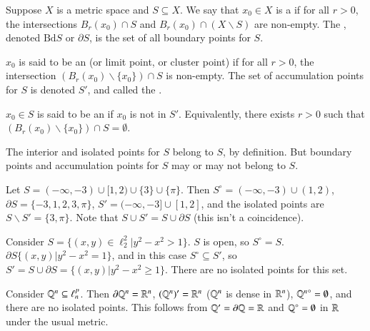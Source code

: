 \begin{definition}
    Suppose $X$ is a metric space and $S \subseteq X$. We say that $x_0 \in X$ is a  if for all $r > 0$, the intersections $B_r(x_0) \cap S$ and $B_r(x_0)\cap (X\backslash S)$ are non-empty. The , denoted $\text{Bd}S$ or $\partial S$, is the set of all boundary points for $S$.

    $x_0$ is said to be an  (or limit point, or cluster point) if for all $r > 0$, the intersection $(B_r(x_0) \backslash \{x_0\})\cap S$ is non-empty. The set of accumulation points for $S$ is denoted $S'$, and called the . 

    $x_0 \in S$ is said to be an  if $x_0$ is not in $S'$. Equivalently, there exists $r > 0$ such that $(B_r(x_0)\backslash\{x_0\})\cap S = \emptyset$.
\end{definition}

The interior and isolated points for $S$ belong to $S$, by definition. But boundary points and accumulation points for $S$ may or may not belong to $S$.

\begin{example}[Subsets of $\R$]
    Let $S = (-\infty,-3)\cup[1,2)\cup\{3\}\cup\{\pi\}$. Then $S^{\circ} = (-\infty,-3)\cup(1,2)$, $\partial S = \{-3,1,2,3,\pi\}$, $S' = (-\infty,-3]\cup[1,2]$, and the isolated points are $S\backslash S' = \{3,\pi\}$. Note that $S\cup S' = S\cup \partial S$ (this isn't a coincidence).
\end{example}

\begin{example}
    Consider $S = \{(x,y) \in \ell_2^2\vert y^2-x^2 > 1\}$. $S$ is open, so $S^{\circ} =S$. $\partial S \{(x,y)\vert y^2-x^2 = 1\}$, and in this case $S^{\circ} \subseteq S'$, so $S' = S \cup \partial S = \{(x,y)\vert y^2-x^2\geq 1\}$. There are no isolated points for this set.
\end{example}

\begin{example}
    Consider $\mathbb Q^n \subseteq \ell_n^p$. Then $\partial \mathbb Q^n = \mathbb R^n$, $(\mathbb Q^n)' = \mathbb R^n$ ($\mathbb Q^n$ is dense in $\mathbb R^n$), ${\mathbb Q^n}^{\circ} = \emptyset$, and there are no isolated points. This follows from $\mathbb Q' = \partial \mathbb Q = \mathbb R$ and $\mathbb Q^{\circ}  = \emptyset$ in $\R$ under the usual metric.
\end{example}


